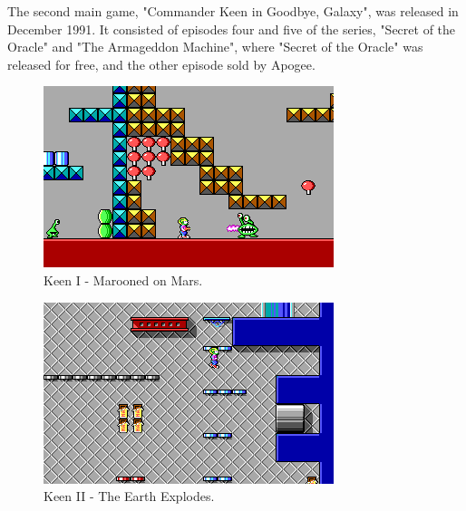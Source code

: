\documentclass[book.tex]{subfiles}
\begin{document}
\par
The second main game, "Commander Keen in Goodbye, Galaxy", was released in December 1991. It consisted of episodes four and five of the series, "Secret of the Oracle" and "The Armageddon Machine", where "Secret of the Oracle" was released for free, and the other episode sold by Apogee.\\

\begin{figure}[H]
  \centering
  \includegraphics[width=.95\textwidth]{screenshots_300dpi/Keen_Marooned_on_Mars_gameplay.png}
  \caption*{Keen I - Marooned on Mars.}
\label{fig:keen_1}
\end{figure}

\begin{figure}[H]
  \centering
  \includegraphics[width=.95\textwidth]{screenshots_300dpi/keen1_2.png}
  \caption*{Keen II - The Earth Explodes.}
\label{fig:keen_1}
\end{figure}
\end{document}
